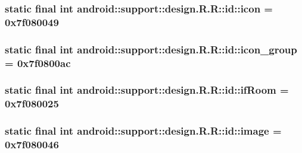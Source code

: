 \hypertarget{classandroid_1_1support_1_1design_1_1_r_1_1id_8f765ae61b88b0817733b3842c6d127e}{
\subsubsection[{icon}]{\setlength{\rightskip}{0pt plus 5cm}static final int android::support::design.R.R::id::icon = 0x7f080049}}
\label{classandroid_1_1support_1_1design_1_1_r_1_1id_8f765ae61b88b0817733b3842c6d127e}


\hypertarget{classandroid_1_1support_1_1design_1_1_r_1_1id_defa29c71078a2f317a4659a4be41bea}{
\subsubsection[{icon\_\-group}]{\setlength{\rightskip}{0pt plus 5cm}static final int android::support::design.R.R::id::icon\_\-group = 0x7f0800ac}}
\label{classandroid_1_1support_1_1design_1_1_r_1_1id_defa29c71078a2f317a4659a4be41bea}


\hypertarget{classandroid_1_1support_1_1design_1_1_r_1_1id_385a58e262aface188e450a4be16161a}{
\subsubsection[{ifRoom}]{\setlength{\rightskip}{0pt plus 5cm}static final int android::support::design.R.R::id::ifRoom = 0x7f080025}}
\label{classandroid_1_1support_1_1design_1_1_r_1_1id_385a58e262aface188e450a4be16161a}


\hypertarget{classandroid_1_1support_1_1design_1_1_r_1_1id_ea33b92cf2e335f7d0ceb12f5619e36f}{
\subsubsection[{image}]{\setlength{\rightskip}{0pt plus 5cm}static final int android::support::design.R.R::id::image = 0x7f080046}}
\label{classandroid_1_1support_1_1design_1_1_r_1_1id_ea33b92cf2e335f7d0ceb12f5619e36f}


